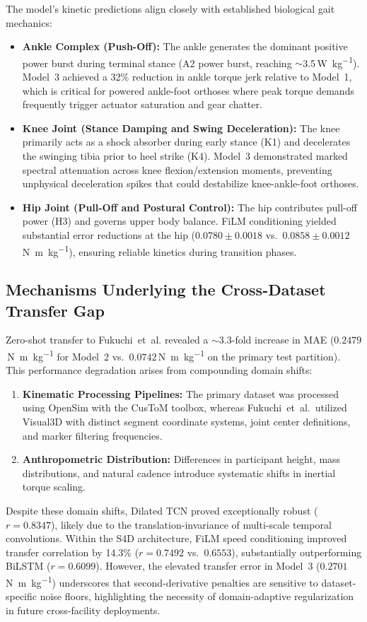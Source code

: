 \documentclass[fleqn,10pt]{wlscirep}
\newcommand{\Nmskg}{\si{\newton\metre\per\kilogram}}
\newcommand{\Wkg}{\si{\watt\per\kilogram}}
\begin{document}
The model's kinetic predictions align closely with established biological gait mechanics:
\begin{itemize}
\item \textbf{Ankle Complex (Push-Off):} The ankle generates the dominant positive power burst during terminal stance (A2 power burst, reaching $\sim$3.5\,\Wkg{}). Model~3 achieved a 32\% reduction in ankle torque jerk relative to Model~1, which is critical for powered ankle-foot orthoses where peak torque demands frequently trigger actuator saturation and gear chatter.
\item \textbf{Knee Joint (Stance Damping and Swing Deceleration):} The knee primarily acts as a shock absorber during early stance (K1) and decelerates the swinging tibia prior to heel strike (K4). Model~3 demonstrated marked spectral attenuation across knee flexion/extension moments, preventing unphysical deceleration spikes that could destabilize knee-ankle-foot orthoses.
\item \textbf{Hip Joint (Pull-Off and Postural Control):} The hip contributes pull-off power (H3) and governs upper body balance. FiLM conditioning yielded substantial error reductions at the hip ($0.0780 \pm 0.0018$ vs.\ $0.0858 \pm 0.0012$\,\Nmskg{}), ensuring reliable kinetics during transition phases.
\end{itemize}

\subsection{Mechanisms Underlying the Cross-Dataset Transfer Gap}

Zero-shot transfer to Fukuchi~et~al.\cite{fukuchi2018public} revealed a $\sim$3.3-fold increase in MAE ($0.2479$\,\Nmskg{} for Model~2 vs.\ $0.0742$\,\Nmskg{} on the primary test partition). This performance degradation arises from compounding domain shifts:
\begin{enumerate}
\item \textbf{Kinematic Processing Pipelines:} The primary dataset was processed using OpenSim with the CusToM toolbox\cite{muller2019custom}, whereas Fukuchi~et~al.\ utilized Visual3D with distinct segment coordinate systems, joint center definitions, and marker filtering frequencies.
\item \textbf{Anthropometric Distribution:} Differences in participant height, mass distributions, and natural cadence introduce systematic shifts in inertial torque scaling.
\end{enumerate}
Despite these domain shifts, Dilated TCN proved exceptionally robust ($r = 0.8347$), likely due to the translation-invariance of multi-scale temporal convolutions. Within the S4D architecture, FiLM speed conditioning improved transfer correlation by 14.3\% ($r = 0.7492$ vs.\ $0.6553$), substantially outperforming BiLSTM ($r = 0.6099$). However, the elevated transfer error in Model~3 ($0.2701$\,\Nmskg{}) underscores that second-derivative penalties are sensitive to dataset-specific noise floors, highlighting the necessity of domain-adaptive regularization in future cross-facility deployments.
\end{document}
